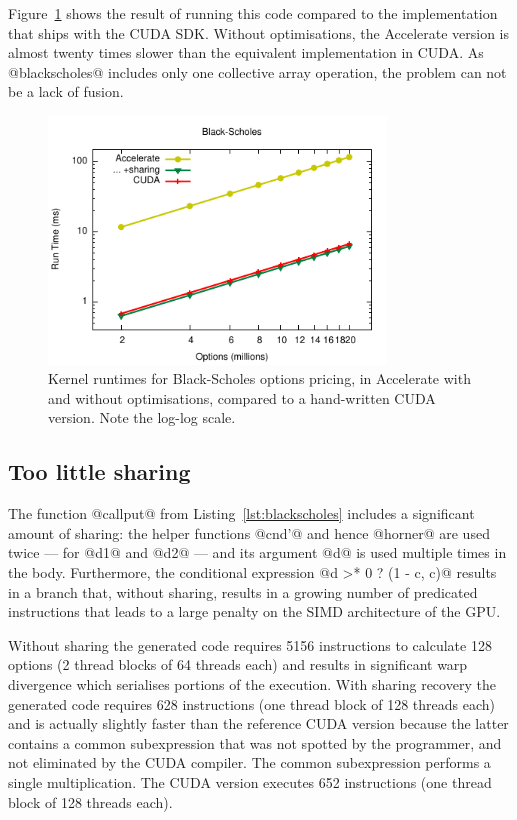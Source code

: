 Figure~\ref{fig:blackscholes} shows the result of running this code compared to
the implementation that ships with the CUDA SDK. Without optimisations, the
Accelerate version is almost twenty times slower than the equivalent
implementation in CUDA\@. As @blackscholes@ includes only one collective array
operation, the problem can not be a lack of fusion.

\begin{figure}
    \begin{center}
        \includegraphics[width=0.8\textwidth]{images/results/black-scholes/black-scholes}
    \end{center}
    \caption[Black-Scholes kernel benchmarks]{Kernel runtimes for Black-Scholes
        options pricing, in Accelerate with and without optimisations, compared
        to a hand-written CUDA version. Note the log-log scale.}
    \label{fig:blackscholes}
\end{figure}

\subsection{Too little sharing}

The function @callput@ from Listing~\ref{lst:blackscholes} includes a
significant amount of sharing: the helper functions @cnd'@ and hence
@horner@ are used twice --- for @d1@ and @d2@ --- and its
argument @d@ is used multiple times in the body. Furthermore, the
conditional expression @d >* 0 ? (1 - c, c)@ results in a branch that,
without sharing, results in a growing number of predicated instructions that
leads to a large penalty on the SIMD architecture of the GPU\@.

Without sharing the generated code requires 5156 instructions to calculate 128
options (2 thread blocks of 64 threads each) and results in significant warp
divergence which serialises portions of the execution. With sharing recovery the
generated code requires 628 instructions (one thread block of 128 threads each)
and is actually slightly faster than the reference CUDA version because the
latter contains a common subexpression that was not spotted by the programmer,
and not eliminated by the CUDA compiler. The common subexpression performs a
single multiplication. The CUDA version executes 652 instructions (one thread
block of 128 threads each).


